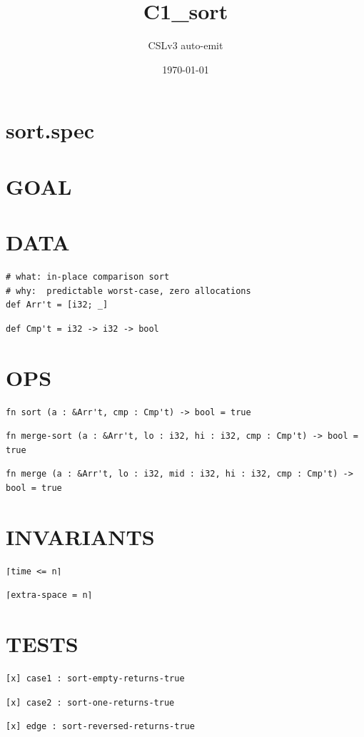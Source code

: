 \documentclass[11pt]{article}
\title{C1\_sort}
\author{CSLv3 auto-emit}
\date{\today}
\begin{document}
\maketitle
\tableofcontents

\section{sort.spec}\label{sec:sortspec}
\section{GOAL}\label{sec:goal}
\section{DATA}\label{sec:data}
\begin{lstlisting}[language=csl]
# what: in-place comparison sort
# why:  predictable worst-case, zero allocations
def Arr't = [i32; _]
\end{lstlisting}
\begin{lstlisting}[language=csl]
def Cmp't = i32 -> i32 -> bool
\end{lstlisting}
\section{OPS}\label{sec:ops}
\begin{lstlisting}[language=csl]
fn sort (a : &Arr't, cmp : Cmp't) -> bool = true
\end{lstlisting}
\begin{lstlisting}[language=csl]
fn merge-sort (a : &Arr't, lo : i32, hi : i32, cmp : Cmp't) -> bool = true
\end{lstlisting}
\begin{lstlisting}[language=csl]
fn merge (a : &Arr't, lo : i32, mid : i32, hi : i32, cmp : Cmp't) -> bool = true
\end{lstlisting}
\section{INVARIANTS}\label{sec:invariants}
\begin{lstlisting}[language=csl]
⌈time <= n⌉
\end{lstlisting}
\begin{lstlisting}[language=csl]
⌈extra-space = n⌉
\end{lstlisting}
\section{TESTS}\label{sec:tests}
\begin{lstlisting}[language=csl]
[x] case1 : sort-empty-returns-true
\end{lstlisting}
\begin{lstlisting}[language=csl]
[x] case2 : sort-one-returns-true
\end{lstlisting}
\begin{lstlisting}[language=csl]
[x] edge : sort-reversed-returns-true
\end{lstlisting}
\end{document}
